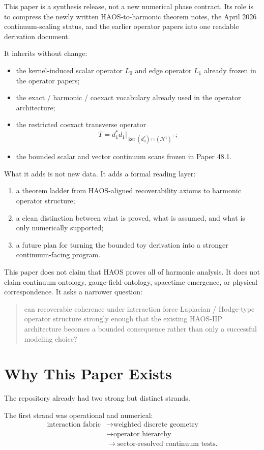 \documentclass[11pt]{article}
\begin{document}
This paper is a synthesis release, not a new numerical phase contract. Its role is to compress the newly written HAOS-to-harmonic theorem notes, the April 2026 continuum-scaling status, and the earlier operator papers into one readable derivation document.

It inherits without change:
\begin{itemize}
\item the kernel-induced scalar operator $L_0$ and edge operator $L_1$ already frozen in the operator papers;
\item the exact / harmonic / coexact vocabulary already used in the operator architecture;
\item the restricted coexact transverse operator
\[
T = d_1^* d_1 \big|_{\ker(d_0^*) \cap (\mathcal H^1)^\perp};
\]
\item the bounded scalar and vector continuum scans frozen in Paper 48.1.
\end{itemize}

What it adds is not new data. It adds a formal reading layer:
\begin{enumerate}
\item a theorem ladder from HAOS-aligned recoverability axioms to harmonic operator structure;
\item a clean distinction between what is proved, what is assumed, and what is only numerically supported;
\item a future plan for turning the bounded toy derivation into a stronger continuum-facing program.
\end{enumerate}

This paper does not claim that HAOS proves all of harmonic analysis. It does not claim continuum ontology, gauge-field ontology, spacetime emergence, or physical correspondence. It asks a narrower question:
\begin{quote}
can recoverable coherence under interaction force Laplacian / Hodge-type operator structure strongly enough that the existing HAOS-IIP architecture becomes a bounded consequence rather than only a successful modeling choice?
\end{quote}

\section{Why This Paper Exists}

The repository already had two strong but distinct strands.

The first strand was operational and numerical:
\[
\begin{aligned}
\text{interaction fabric}
&\to
\text{weighted discrete geometry} \\
&\to
\text{operator hierarchy} \\
&\to
\text{sector-resolved continuum tests}.
\end{aligned}
\]
\end{document}
